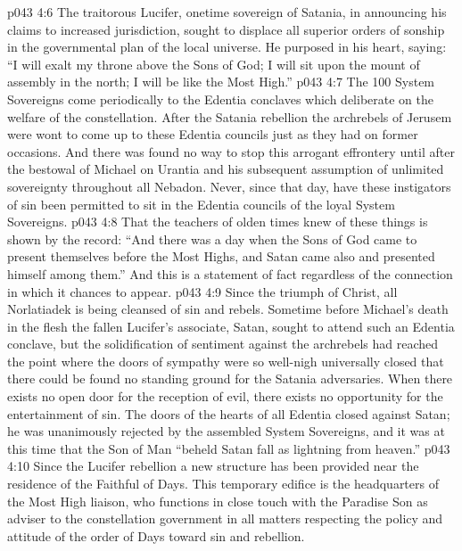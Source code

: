 \vs p043 4:6 The traitorous Lucifer, onetime sovereign of Satania, in announcing his claims to increased jurisdiction, sought to displace all superior orders of sonship in the governmental plan of the local universe. He purposed in his heart, saying: “I will exalt my throne above the Sons of God; I will sit upon the mount of assembly in the north; I will be like the Most High.”
\vs p043 4:7 \pc The 100 System Sovereigns come periodically to the Edentia conclaves which deliberate on the welfare of the constellation. After the Satania rebellion the archrebels of Jerusem were wont to come up to these Edentia councils just as they had on former occasions. And there was found no way to stop this arrogant effrontery until after the bestowal of Michael on Urantia and his subsequent assumption of unlimited sovereignty throughout all Nebadon. Never, since that day, have these instigators of sin been permitted to sit in the Edentia councils of the loyal System Sovereigns.
\vs p043 4:8 That the teachers of olden times knew of these things is shown by the record: “And there was a day when the Sons of God came to present themselves before the Most Highs, and Satan came also and presented himself among them.” And this is a statement of fact regardless of the connection in which it chances to appear.
\vs p043 4:9 \pc Since the triumph of Christ, all Norlatiadek is being cleansed of sin and rebels. Sometime before Michael’s death in the flesh the fallen Lucifer’s associate, Satan, sought to attend such an Edentia conclave, but the solidification of sentiment against the archrebels had reached the point where the doors of sympathy were so well\hyp{}nigh universally closed that there could be found no standing ground for the Satania adversaries. When there exists no open door for the reception of evil, there exists no opportunity for the entertainment of sin. The doors of the hearts of all Edentia closed against Satan; he was unanimously rejected by the assembled System Sovereigns, and it was at this time that the Son of Man “beheld Satan fall as lightning from heaven.”
\vs p043 4:10 Since the Lucifer rebellion a new structure has been provided near the residence of the Faithful of Days. This temporary edifice is the headquarters of the Most High liaison, who functions in close touch with the Paradise Son as adviser to the constellation government in all matters respecting the policy and attitude of the order of Days toward sin and rebellion.

